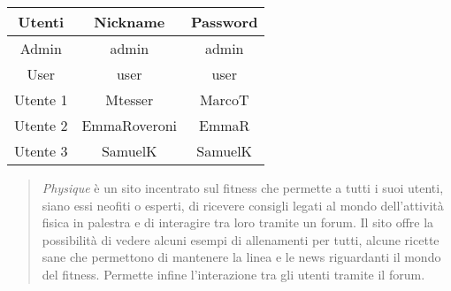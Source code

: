 \begin{table}[H]
	\centering
	\begin{tabular}{c|c c}
		\textbf{Utenti} & \textbf{Nickname} & \textbf{Password} \\
		\hline
		Admin           & admin        & admin        \\
		User            & user         & user         \\
		Utente 1        & Mtesser      & MarcoT       \\
		Utente 2        & EmmaRoveroni & EmmaR        \\
		Utente 3        & SamuelK      & SamuelK      \\
	\end{tabular}
\end{table}
\newpage
{}
\tableofcontents
\newpage
{}
\renewcommand{\abstractname}{Abstract}
\begin{abstract}
	\emph{Physique} è un sito incentrato sul fitness che permette a tutti i suoi utenti, siano essi neofiti o esperti, di ricevere consigli legati al mondo dell'attività fisica in palestra e di interagire tra loro tramite un forum. \newline
	Il sito offre la possibilità di vedere alcuni esempi di allenamenti per tutti, alcune ricette sane che permettono di mantenere la linea e le news riguardanti il mondo del fitness. Permette infine l'interazione tra gli utenti tramite il forum.
\end{abstract}
\newpage

\newpage

\newpage

\newpage

\newpage


